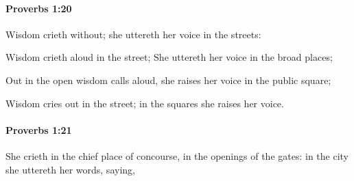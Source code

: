 		\paragraph{Proverbs 1:20} %
			\label{PROVERBS-1-20}

			Wisdom crieth without; she uttereth her voice in the streets:

			\begin{versebox}
					\item[BHS] 
					\item[ASV] Wisdom crieth aloud in the street; She uttereth her voice in the broad places;
					\item[NIV] Out in the open wisdom calls aloud, she raises her voice in the public square;
					\item[NRSV] Wisdom cries out in the street; in the squares she raises her voice.
			\end{versebox}

		\paragraph{Proverbs 1:21} %
			\label{PROVERBS-1-21}

			She crieth in the chief place of concourse, in the openings of the gates: in the city she uttereth her words, saying,

